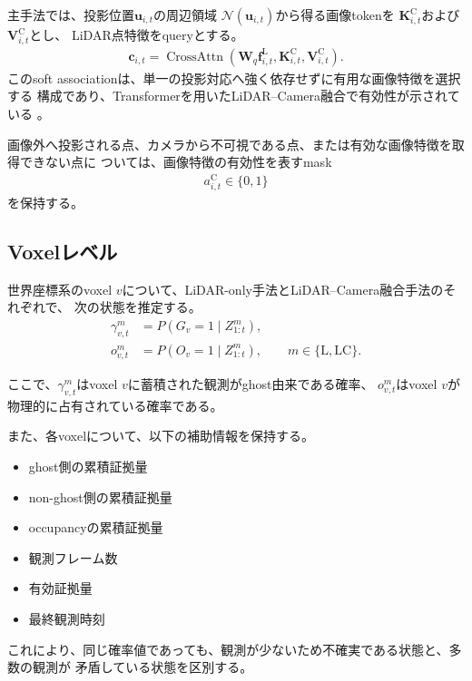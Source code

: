 \documentclass[uplatex,a4paper,11pt]{jsarticle}
\begin{document}
主手法では、投影位置$\bm{u}_{i,t}$の周辺領域
$\mathcal{N}(\bm{u}_{i,t})$から得る画像tokenを
$\bm{K}_{i,t}^{\mathrm{C}}$および$\bm{V}_{i,t}^{\mathrm{C}}$とし、
LiDAR点特徴をqueryとする。
\begin{align}
  \bm{c}_{i,t}
  =
  \operatorname{CrossAttn}
  \left(
    \bm{W}_{q}\bm{f}_{i,t}^{\mathrm{L}},
    \bm{K}_{i,t}^{\mathrm{C}},
    \bm{V}_{i,t}^{\mathrm{C}}
  \right).
\end{align}
このsoft associationは、単一の投影対応へ強く依存せずに有用な画像特徴を選択する
構成であり、Transformerを用いたLiDAR--Camera融合で有効性が示されている
\cite{bai2022_transfusion}。

画像外へ投影される点、カメラから不可視である点、または有効な画像特徴を取得できない点に
ついては、画像特徴の有効性を表すmask
\begin{align}
  a_{i,t}^{\mathrm{C}}
  \in
  \{0,1\}
\end{align}
を保持する。

\subsection{Voxelレベル}

世界座標系のvoxel $v$について、LiDAR-only手法とLiDAR--Camera融合手法のそれぞれで、
次の状態を推定する。
\begin{align}
  \gamma_{v,t}^{m}
  &=
  P
  \left(
    G_v=1
    \mid
    Z_{1:t}^{m}
  \right),\\
  o_{v,t}^{m}
  &=
  P
  \left(
    O_v=1
    \mid
    Z_{1:t}^{m}
  \right),
  \qquad
  m\in\{\mathrm{L},\mathrm{LC}\}.
\end{align}

ここで、$\gamma_{v,t}^{m}$はvoxel $v$に蓄積された観測がghost由来である確率、
$o_{v,t}^{m}$はvoxel $v$が物理的に占有されている確率である。

また、各voxelについて、以下の補助情報を保持する。
\begin{itemize}
  \item ghost側の累積証拠量
  \item non-ghost側の累積証拠量
  \item occupancyの累積証拠量
  \item 観測フレーム数
  \item 有効証拠量
  \item 最終観測時刻
\end{itemize}

これにより、同じ確率値であっても、観測が少ないため不確実である状態と、多数の観測が
矛盾している状態を区別する。
\end{document}
